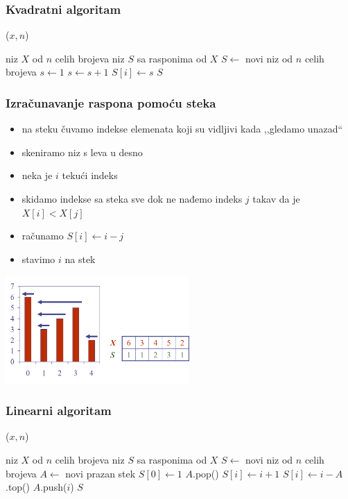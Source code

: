 \documentclass[compress]{beamer}
\begin{document}
\begin{frame}[fragile]
  \frametitle{Kvadratni algoritam}
($x, n$)
\begin{algorithmic}
\REQUIRE niz $X$ od $n$ celih brojeva
\ENSURE niz $S$ sa rasponima od $X$
\STATE $S \leftarrow$ novi niz od $n$ celih brojeva
  \STATE $s\leftarrow 1$
    \STATE $s\leftarrow s+1$
  \ENDWHILE
  \STATE $S[i]\leftarrow s$
  \RETURN $S$
\ENDFOR
\end{algorithmic}
\end{frame}

\begin{frame}[fragile]
  \frametitle{Izračunavanje raspona pomoću steka}
  \begin{itemize}
    \item na steku čuvamo indekse elemenata koji su vidljivi kada ,,gledamo unazad``
    \item skeniramo niz s leva u desno
    \item neka je $i$ tekući indeks
    \item skidamo indekse sa steka sve dok ne nađemo indeks $j$ takav da je $X[i]<X[j]$
    \item računamo $S[i]\leftarrow i-j$
    \item stavimo $i$ na stek
  \end{itemize}
  \begin{center}
    \includegraphics[width=7cm]{asp-05-pic06.png}
  \end{center}
\end{frame}

\begin{frame}[fragile,shrink=5]
  \frametitle{Linearni algoritam}
($x, n$)
\begin{algorithmic}
\REQUIRE niz $X$ od $n$ celih brojeva
\ENSURE niz $S$ sa rasponima od $X$
\STATE $S \leftarrow$ novi niz od $n$ celih brojeva
\STATE $A \leftarrow$ novi prazan stek
\STATE $S[0]\leftarrow 1$
    \STATE $A$.pop()
  \ENDWHILE
    \STATE $S[i]\leftarrow i+1$
  \ELSE
    \STATE $S[i]\leftarrow i-A$.top()
  \ENDIF
  \STATE $A$.push($i$)  
\ENDFOR
\RETURN $S$
\end{algorithmic}
\end{frame}
\end{document}
